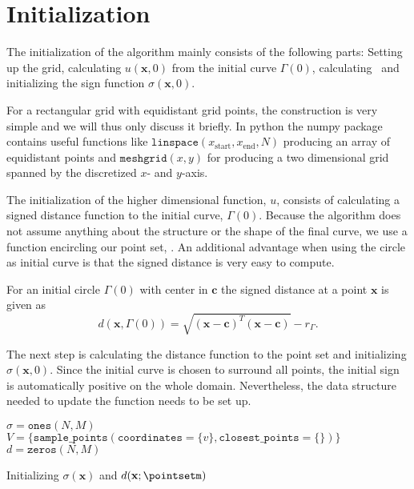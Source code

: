 \section{Initialization}
The initialization of the algorithm mainly consists of the following parts: Setting up the grid, calculating $u(\mathbf{x}, 0)$ from the initial curve $\Gamma(0)$, calculating \distanceV\ and initializing the sign function $\sigma(\mathbf{x}, 0)$. 

For a rectangular grid with equidistant grid points, the construction is very simple and we will thus only discuss it briefly. In python the numpy package contains useful functions like $\texttt{linspace}(x_{\text{start}}, x_{\text{end}}, N)$ producing an array of equidistant points and $\texttt{meshgrid}(x, y)$ for producing a two dimensional grid spanned by the discretized $x$- and $y$-axis. 

The initialization of the higher dimensional function, $u$, consists of calculating a signed distance function to the initial curve, $\Gamma(0)$. Because the algorithm does not assume anything about the structure or the shape of the final curve, we use a function encircling our point set, \pointset. An additional advantage when using the circle as initial curve is that the signed distance is very easy to compute.

For an initial circle $\Gamma(0)$ with center in $\mathbf{c}$ the signed distance at a point $\mathbf{x}$ is given as
\begin{equation}
    d(\mathbf{x}, \Gamma(0)) = \sqrt{(\mathbf{x}-\mathbf{c})^T(\mathbf{x}-\mathbf{c})}-r_{\Gamma}.
    \label{eq:signed-distance-circle}
\end{equation}

The next step is calculating the distance function to the point set and initializing $\sigma(\mathbf{x}, 0)$. Since the initial curve is chosen to surround all points, the initial sign is automatically positive on the whole domain. Nevertheless, the data structure needed to update the function needs to be set up. 


\begin{algorithm}[H]
\SetAlgoLined
$\sigma = \texttt{ones}(N, M)$ \;
$V = \{\texttt{sample\_points}(\texttt{coordinates}=\{v\}, \texttt{closest\_points}=\{\})\}$ \;
$d = \texttt{zeros}(N, M)$



 \caption{Initializing $\sigma(\mathbf{x})$ and $d(\mathbf{x};\pointsetm)$}
 \label{alg:sigma-dist}
\end{algorithm}


